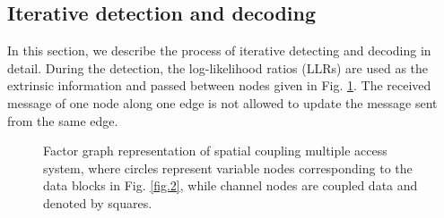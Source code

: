 \documentclass[conference]{IEEEtran}
\begin{document}
\subsection{Iterative detection and decoding}
In this section, we describe the process of iterative detecting and decoding in detail. During the detection, the log-likelihood ratios (LLRs) are used as the extrinsic information and passed between nodes given in Fig. \ref{fig.5}. The received message of one node along one edge is not allowed to update the message sent from the same edge.

\begin{figure}[h!]
\vspace{-1em}
\setlength{\abovecaptionskip}{0.cm}
\setlength{\belowcaptionskip}{-0.cm}
  \caption{Factor graph representation of spatial coupling multiple access system, where circles represent variable nodes corresponding to the data blocks in Fig. \ref{fig.2}, while channel nodes are coupled data and denoted by squares.}\label{fig.5}
    \vspace{-1em}
\end{figure}
\end{document}
